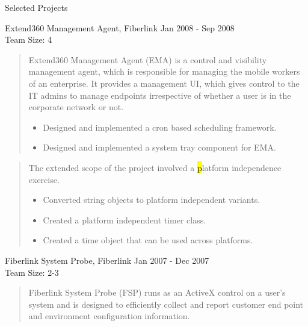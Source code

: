\documentclass{resume}
\newcommand{\teamsize}{\\\sc\footnotesize Team Size: }
\begin{document}
\begin{category}{Selected Projects}{}

    \item {\topic Extend360 Management Agent,} Fiberlink
        {\period Jan 2008 - Sep 2008}
        {\teamsize 4}
        \begin{quote}
            Extend360 Management Agent (EMA) is a control and visibility
            management agent, which is responsible for managing the mobile
            workers of an enterprise. It provides a management UI, which gives
            control to the IT admins to manage endpoints irrespective of
            whether a user is in the corporate network or not.

            \begin{itemize}
                \item Designed and implemented a cron based scheduling framework.
                \item Designed and implemented a system tray component for EMA.
            \end{itemize}
        \end{quote}
        \begin{quote}
            The extended scope of the project involved a {\hl platform
            independence} exercise.

            \begin{itemize}
                \item Converted string objects to platform independent
                    variants.
                \item Created a platform independent timer class.
                \item Created a time object that can be used across platforms.
            \end{itemize}
        \end{quote}

    \item {\topic Fiberlink System Probe,} Fiberlink
        {\period Jan 2007 - Dec 2007}
        {\teamsize 2-3}
        \begin{quote}
            Fiberlink System Probe (FSP) runs as an ActiveX control on a
            user's system and is designed to efficiently collect and report
            customer end point and environment configuration information.


\end{quote}
\end{category}
\end{document}
